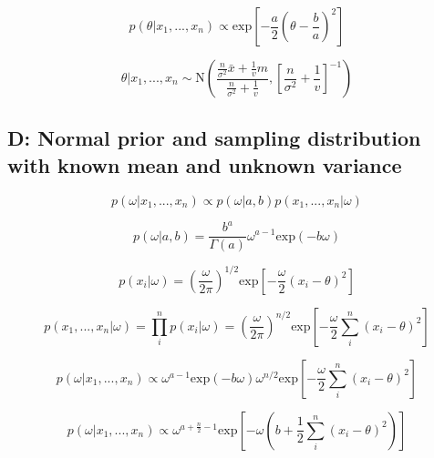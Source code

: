 \documentclass[12pt]{article}
\begin{document}
        \begin{equation}
              p(\theta|x_1,...,x_n) \propto \text{exp} \left[ - \frac{a}{2} \left ( \theta - \frac{b}{a}\right ) ^2 \right]
        \end{equation}

        \begin{equation}
              \theta | x_1,...,x_n \sim \text{N} \left( \frac{\frac{n}{\sigma^2} \bar{x} + \frac{1}{v}m}{\frac{n}{\sigma^2} + \frac{1}{v}}, \left [ \frac{n}{\sigma^2} + \frac{1}{v}\right]^{-1} \right)
        \end{equation}

    \subsection*{D: Normal prior and sampling distribution with known mean and unknown variance}

        \begin{equation}
              p(\omega|x_1,..., x_n) \propto p(\omega|a,b)p(x_1,...,x_n|\omega)
        \end{equation}

        \begin{equation}
              p(\omega|a,b) = \frac{b^a}{\Gamma(a)} \omega^{a-1} \text{exp}(-b \omega)
        \end{equation}

        \begin{equation}
              p(x_i|\omega) = \left( \frac{\omega}{2 \pi}\right)^{1/2} \text{exp} \left [ -\frac{\omega}{2}(x_i - \theta)^2\right]
        \end{equation}

        \begin{equation}
              p(x_1,...,x_n|\omega) = \prod_i^n p(x_i|\omega) = \left( \frac{\omega}{2 \pi}\right)^{n/2} \text{exp} \left [ -\frac{\omega}{2}\sum_i^n(x_i - \theta)^2\right]
        \end{equation}

        \begin{equation}
              p(\omega|x_1,..., x_n) \propto \omega^{a-1} \text{exp}(-b \omega) \omega^{n/2} \text{exp} \left [ -\frac{\omega}{2}\sum_i^n(x_i - \theta)^2\right]
        \end{equation}

        \begin{equation}
              p(\omega|x_1,..., x_n) \propto \omega^{a + \frac{n}{2} - 1} \text{exp} \left [ -\omega \left (b+ \frac{1}{2}\sum_i^n(x_i - \theta)^2 \right )\right]
        \end{equation}
\end{document}

